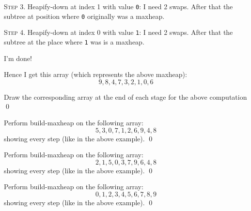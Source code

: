 


\textsc{Step 3.}
Heapify-down at index 1 with value \texttt{0}:
I need 2 swaps.
After that the subtree at position where \texttt{0} originally 
was a maxheap.



\textsc{Step 4.}
Heapify-down at index 0 with value \texttt{1}:
I need 2 swaps.
After that the subtree at the place
where \texttt{1} was is a maxheap.



I'm done!

Hence I get this array (which represents the above maxheap):
\[
9,8,4,7,3,2,1,0,6
\]


\newpage
\begin{ex}
Draw the corresponding array at the end of each stage
for the above computation
\qed
\end{ex}


\newpage
\begin{ex}
Perform build-maxheap on the following array:
\[
5,3,0,7,1,2,6,9,4,8
\]
showing every step (like in the above example).
\qed
\end{ex}


\newpage
\begin{ex}
Perform build-maxheap on the following array:
\[
2,1,5,0,3,7,9,6,4,8
\]
showing every step (like in the above example).
\qed
\end{ex}


\newpage
\begin{ex}
Perform build-maxheap on the following array:
\[
0,1,2,3,4,5,6,7,8,9
\]
showing every step (like in the above example).
\qed
\end{ex}


